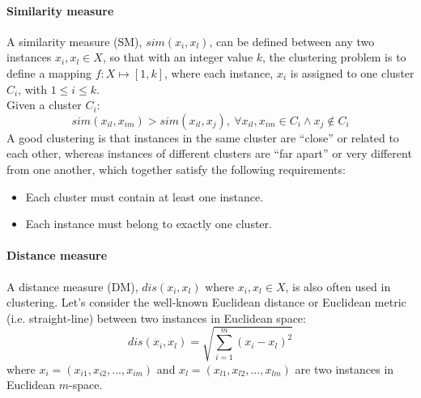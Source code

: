 \paragraph{Similarity measure} A similarity measure (SM), $sim(x_i, x_l)$, can be defined between any two instances $x_i, x_l \in X$, so that with an integer value $k$, the clustering problem is to define a mapping $f : X \mapsto [1, k]$, where each instance, $x_i$ is assigned
to one cluster $C_i$, with $1 \leq i \leq k$.\\
Given a cluster $C_i$:
\begin{equation*}
    sim(x_{il}, x_{im}) > sim(x_{il}, x_j), ~\forall x_{il}, x_{im} \in C_i \wedge x_j \notin C_i
\end{equation*}
A good clustering is that instances in the same cluster are “close” or related to each other, whereas instances of different clusters are “far
apart” or very different from one another, which together satisfy the following requirements:
\begin{itemize}
    \item Each cluster must contain at least one instance.
    \item Each instance must belong to exactly one cluster.
\end{itemize}

\paragraph{Distance measure} A distance measure (DM), $dis(x_i, x_l)$ where $x_i, x_l \in X$, is also often used in clustering. Let’s consider the
well-known Euclidean distance or Euclidean metric (i.e. straight-line) between two instances in Euclidean space:
\begin{equation*}
    dis(x_i, x_l) = \sqrt{\sum_{i = 1}^m(x_i - x_l)^2}
\end{equation*}
where $x_i = (x_{i1}, x_{i2}, ..., x_{im})$ and $x_l = (x_{l1}, x_{l2}, ..., x_{lm})$ are two
instances in Euclidean $m$-space.

